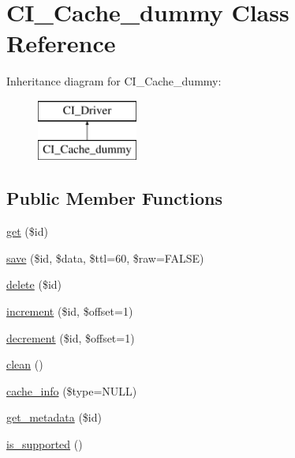 \hypertarget{class_c_i___cache__dummy}{}\section{C\+I\+\_\+\+Cache\+\_\+dummy Class Reference}
\label{class_c_i___cache__dummy}
Inheritance diagram for C\+I\+\_\+\+Cache\+\_\+dummy\+:\begin{figure}[H]
\begin{center}
\leavevmode
\includegraphics[height=2.000000cm]{class_c_i___cache__dummy}
\end{center}
\end{figure}
\subsection*{Public Member Functions}
\begin{DoxyCompactItemize}
\item 
\mbox{\hyperlink{class_c_i___cache__dummy_a50e3bfb586b2f42932a6a93f3fbb0828}{get}} (\$id)
\item 
\mbox{\hyperlink{class_c_i___cache__dummy_a472645db04a8ce4b040b789a3062a7d2}{save}} (\$id, \$data, \$ttl=60, \$raw=F\+A\+L\+SE)
\item 
\mbox{\hyperlink{class_c_i___cache__dummy_a2f8258add505482d7f00ea26493a5723}{delete}} (\$id)
\item 
\mbox{\hyperlink{class_c_i___cache__dummy_a2f07a4e09b57f4460d49852497d1808f}{increment}} (\$id, \$offset=1)
\item 
\mbox{\hyperlink{class_c_i___cache__dummy_a4eb1c2772c8efc48c411ea060dd040b7}{decrement}} (\$id, \$offset=1)
\item 
\mbox{\hyperlink{class_c_i___cache__dummy_adb40b812890a8bc058bf6b7a0e1a54d9}{clean}} ()
\item 
\mbox{\hyperlink{class_c_i___cache__dummy_aa8b9c4d9f0387156736ccd8850f0727e}{cache\+\_\+info}} (\$type=N\+U\+LL)
\item 
\mbox{\hyperlink{class_c_i___cache__dummy_a59635cf18e997c5141bffa05ff7622e0}{get\+\_\+metadata}} (\$id)
\item 
\mbox{\hyperlink{class_c_i___cache__dummy_a98c68fd153468bc148c4ed8c716859fc}{is\+\_\+supported}} ()
\end{DoxyCompactItemize}
